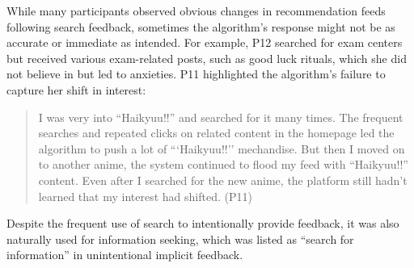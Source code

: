 While many participants observed obvious changes in recommendation feeds following search feedback, sometimes the algorithm's response might not be as accurate or immediate as intended. For example, P12 searched for exam centers but received various exam-related posts, such as good luck rituals, which she did not believe in but led to anxieties. P11 highlighted the algorithm's failure to capture her shift in interest:
\begin{quote}
   I was very into ``Haikyuu!!'' and searched for it many times. The frequent searches and repeated clicks on related content in the homepage led the algorithm to push a lot of ```Haikyuu!!'' mechandise. But then I moved on to another anime, the system continued to flood my feed with ``Haikyuu!!'' content. Even after I searched for the new anime, the platform still hadn't learned that my interest had shifted. (P11)
\end{quote}
Despite the frequent use of search to intentionally provide feedback, it was also naturally used for information seeking, which was listed as ``search for information'' in unintentional implicit feedback.



